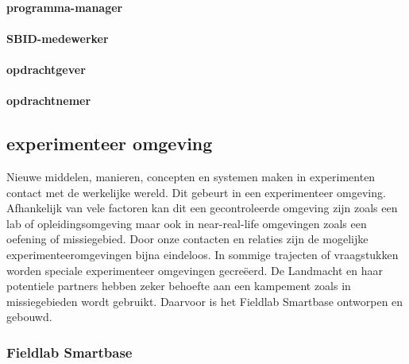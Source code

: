 \documentclass[
]{book}
\begin{document}
\hypertarget{programma-manager}{%
\paragraph*{programma-manager}\label{programma-manager}}

\hypertarget{sbid-medewerker}{%
\paragraph*{SBID-medewerker}\label{sbid-medewerker}}

\hypertarget{opdrachtgever}{%
\paragraph*{opdrachtgever}\label{opdrachtgever}}

\hypertarget{opdrachtnemer}{%
\paragraph*{opdrachtnemer}\label{opdrachtnemer}}

\hypertarget{experimenteer-omgeving}{%
\subsection{experimenteer omgeving}\label{experimenteer-omgeving}}

Nieuwe middelen, manieren, concepten en systemen maken in experimenten contact met de werkelijke wereld. Dit gebeurt in een experimenteer omgeving. Afhankelijk van vele factoren kan dit een gecontroleerde omgeving zijn zoals een lab of opleidingsomgeving maar ook in near-real-life omgevingen zoals een oefening of missiegebied. Door onze contacten en relaties zijn de mogelijke experimenteeromgevingen bijna eindeloos. In sommige trajecten of vraagstukken worden speciale experimenteer omgevingen gecreëerd. De Landmacht en haar potentiele partners hebben zeker behoefte aan een kampement zoals in missiegebieden wordt gebruikt. Daarvoor is het Fieldlab Smartbase ontworpen en gebouwd.

\hypertarget{fieldlab-smartbase}{%
\subsubsection{Fieldlab Smartbase}\label{fieldlab-smartbase}}
\end{document}
